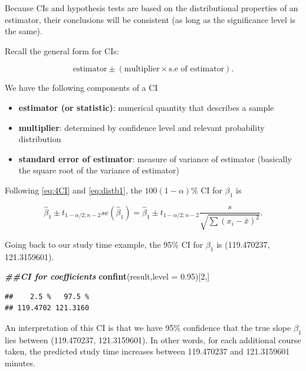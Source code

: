 \documentclass[
]{book}
\newenvironment{Shaded}{\begin{snugshade}}{\end{snugshade}}
\newcommand{\AttributeTok}[1]{\textcolor[rgb]{0.13,0.29,0.53}{#1}}
\newcommand{\DecValTok}[1]{\textcolor[rgb]{0.00,0.00,0.81}{#1}}
\newcommand{\DocumentationTok}[1]{\textcolor[rgb]{0.56,0.35,0.01}{\textbf{\textit{#1}}}}
\newcommand{\FloatTok}[1]{\textcolor[rgb]{0.00,0.00,0.81}{#1}}
\newcommand{\FunctionTok}[1]{\textcolor[rgb]{0.13,0.29,0.53}{\textbf{#1}}}
\newcommand{\NormalTok}[1]{#1}
\providecommand{\tightlist}{%
  \setlength{\itemsep}{0pt}\setlength{\parskip}{0pt}}
\begin{document}
Because CIs and hypothesis tests are based on the distributional properties of an estimator, their conclusions will be consistent (as long as the significance level is the same).

Recall the general form for CIs:

\begin{equation} 
\mbox{estimator} \pm (\mbox{multiplier} \times \mbox{s.e of estimator}). 
\label{eq:4CI}
\end{equation}

We have the following components of a CI

\begin{itemize}
\tightlist
\item
  \textbf{estimator (or statistic)}: numerical quantity that describes a sample
\item
  \textbf{multiplier}: determined by confidence level and relevant probability distribution
\item
  \textbf{standard error of estimator}: measure of variance of estimator (basically the square root of the variance of estimator)
\end{itemize}

Following \eqref{eq:4CI} and \eqref{eq:distb1}, the \(100(1-\alpha)\%\) CI for \(\beta_1\) is

\begin{equation} 
\hat{\beta}_1 \pm t_{1-\alpha/2;n-2}  se(\hat{\beta}_1) = \hat{\beta}_1 \pm t_{1-\alpha/2;n-2} \frac{s}{\sqrt{\sum(x_i - \bar{x})^{2}}}.
\label{eq:4CIb1}
\end{equation}

Going back to our study time example, the 95\% CI for \(\beta_1\) is (119.470237, 121.3159601).

\begin{Shaded}
\begin{Highlighting}[]
\DocumentationTok{\#\#CI for coefficients}
\FunctionTok{confint}\NormalTok{(result,}\AttributeTok{level =} \FloatTok{0.95}\NormalTok{)[}\DecValTok{2}\NormalTok{,]}
\end{Highlighting}
\end{Shaded}

\begin{verbatim}
##    2.5 %   97.5 % 
## 119.4702 121.3160
\end{verbatim}

An interpretation of this CI is that we have 95\% confidence that the true slope \(\beta_1\) lies between (119.470237, 121.3159601). In other words, for each additional course taken, the predicted study time increases between 119.470237 and 121.3159601 minutes.
\end{document}
